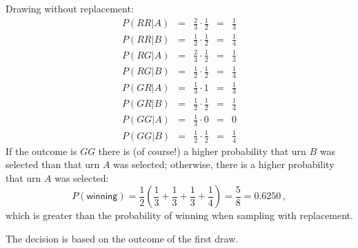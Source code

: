  Drawing without replacement:
\[
\renewcommand*{\arraystretch}{1.5}
\begin{array}{lcccc}
P(RR|A) &=& \frac{2}{3} \cdot \frac{1}{2} &=& \frac{1}{3}\\
P(RR|B) &=& \frac{1}{2} \cdot \frac{1}{2} &=& \frac{1}{4}\\
\hline
P(RG|A) &=& \frac{2}{3} \cdot \frac{1}{2} &=& \frac{1}{3}\\
P(RG|B) &=& \frac{1}{2} \cdot \frac{1}{2} &=& \frac{1}{4}\\
\hline
P(GR|A) &=& \frac{1}{3} \cdot 1 &=& \frac{1}{3}\\
P(GR|B) &=& \frac{1}{2} \cdot \frac{1}{2} &=& \frac{1}{4}\\
\hline
P(GG|A) &=& \frac{1}{3} \cdot 0 &=& 0\\
P(GG|B) &=& \frac{1}{2} \cdot \frac{1}{2} &=& \frac{1}{4}
\end{array}
\]
If the outcome is $GG$ there is (of course!) a higher probability that urn $B$ was selected than that urn $A$ was selected; otherwise, there is a higher probability that urn $A$ was selected:
\[
P(\textsf{winning})=\frac{1}{2}\left(\frac{1}{3} + \frac{1}{3}+ \frac{1}{3}+ \frac{1}{4}\right)=\frac{5}{8}=0.6250\,,
\]
which is greater than the probability of winning when sampling with replacement.

 The decision is based on the outcome of the first draw.

